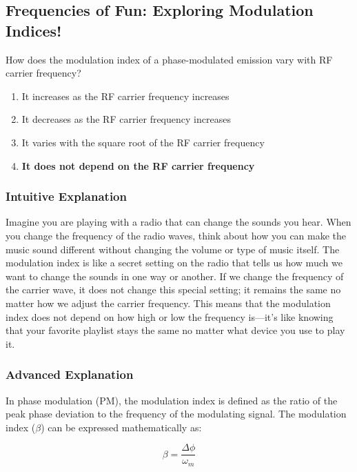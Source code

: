 \subsection{Frequencies of Fun: Exploring Modulation Indices!}
\begin{tcolorbox}[colback=gray!10, colframe=gray!80, title={Question ID: \textbf{E8B02}}]
    How does the modulation index of a phase-modulated emission vary with RF carrier frequency?
    \begin{enumerate}[label=\Alph*.]
        \item It increases as the RF carrier frequency increases
        \item It decreases as the RF carrier frequency increases
        \item It varies with the square root of the RF carrier frequency
        \item \textbf{It does not depend on the RF carrier frequency}
    \end{enumerate}
\end{tcolorbox}

\subsubsection{Intuitive Explanation}
Imagine you are playing with a radio that can change the sounds you hear. When you change the frequency of the radio waves, think about how you can make the music sound different without changing the volume or type of music itself. The modulation index is like a secret setting on the radio that tells us how much we want to change the sounds in one way or another. If we change the frequency of the carrier wave, it does not change this special setting; it remains the same no matter how we adjust the carrier frequency. This means that the modulation index does not depend on how high or low the frequency is—it's like knowing that your favorite playlist stays the same no matter what device you use to play it.

\subsubsection{Advanced Explanation}
In phase modulation (PM), the modulation index is defined as the ratio of the peak phase deviation to the frequency of the modulating signal. The modulation index (\( \beta \)) can be expressed mathematically as:

\[
\beta = \frac{\Delta \phi}{\omega_m}
\]

